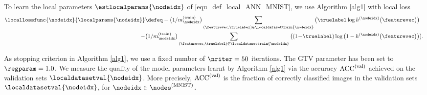 \documentclass[lettersize,journal]{IEEEtran}
\newcommand{\nodesmnist}{\nodes^{(\rm MNIST)}}
\newcommand{\localtrainsetsize}[1]{m^{(\rm train)}_{#1}}
\begin{document}
To learn the local parameters $\estlocalparams{\nodeidx}$ of \eqref{equ_def_local_ANN_MNIST}, we use 
Algorithm \ref{alg1} with local loss 
\begin{equation*}
    \begin{aligned}
        \locallossfunc{\nodeidx}{\localparams{\nodeidx}} & \defeq 
         -\big(1/\localtrainsetsize{\nodeidx}\big)
        \sum_{\left(\featurevec,\truelabel\right) \in \localdatasettrain{\nodeidx}} \big( \truelabel \log{h^{(\nodeidx)}\big(\featurevec\big)} \big ) \\
        - & \big(1/\localtrainsetsize{\nodeidx}\big)  \sum_{\left(\featurevec,\truelabel\right) \in \localdatasettrain{\nodeidx}} \big( (1\!-\!\truelabel) \log{\big(1 - h^{(\nodeidx)}\big(\featurevec\big)\big)} \big ).
    \end{aligned}
    \vspace{-2mm}
\end{equation*}

As stopping criterion in Algorithm \ref{alg1}, we use a fixed number of $\nriter=50$ iterations. The GTV parameter 
has been set to $\regparam=1.0$. We measure the quality of the model parameters learnt by Algorithm \ref{alg1} 
via the accuracy ${\rm ACC}^{(\rm val)}$ achieved on the validation sets $\localdatasetval{\nodeidx}$. 
More precisely, ${\rm ACC}^{(\rm val)}$ is the fraction of correctly classified images in the 
validation sets $\localdatasetval{\nodeidx}$, for $\nodeidx \in \nodesmnist$. 
\end{document}
